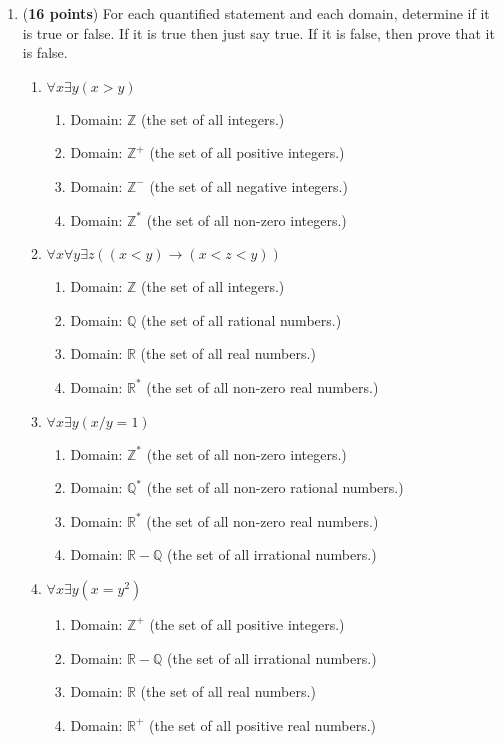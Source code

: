 \documentclass[10pt,letterpaper,unboxed,cm]{article}
\begin{document}
\begin{enumerate}
    
 \item({\bf 16 points})
For each quantified statement and each domain, determine if it is true or false. If it is true then just say true. If it is false, then prove that it is false.

\begin{enumerate}
\item
$\forall x\exists y (x>y)$
\begin{enumerate}
\item
Domain: $\mathbb{Z}$ (the set of all integers.)
\item
Domain: $\mathbb{Z}^+$ (the set of all positive integers.)
\item
Domain: $\mathbb{Z}^-$ (the set of all negative integers.)
\item
Domain: $\mathbb{Z}^*$ (the set of all non-zero integers.)
\end{enumerate}
\item
$\forall x\forall y \exists z((x<y)\to (x<z<y))$
\begin{enumerate}
\item
Domain: $\mathbb{Z}$ (the set of all integers.)
\item
Domain: $\mathbb{Q}$ (the set of all rational numbers.)
\item
Domain: $\mathbb{R}$ (the set of all real numbers.)
\item
Domain: $\mathbb{R}^*$ (the set of all non-zero real numbers.)
\end{enumerate}
\item
$\forall x\exists y (x/y=1)$
\begin{enumerate}
\item
Domain: $\mathbb{Z^*}$ (the set of all non-zero integers.)
\item
Domain: $\mathbb{Q^*}$ (the set of all non-zero rational numbers.)
\item
Domain: $\mathbb{R}^*$ (the set of all non-zero real numbers.)
\item
Domain: $\mathbb{R}-\mathbb{Q}$ (the set of all irrational numbers.)
\end{enumerate}
\item
$\forall x\exists y (x=y^2)$
\begin{enumerate}
\item
Domain: $\mathbb{Z^+}$ (the set of all positive integers.)
\item
Domain: $\mathbb{R}-\mathbb{Q}$ (the set of all irrational numbers.)
\item
Domain: $\mathbb{R}$ (the set of all real numbers.)
\item
Domain: $\mathbb{R}^+$ (the set of all positive real numbers.)
\end{enumerate}
\end{enumerate}


\end{enumerate}
\end{document}
